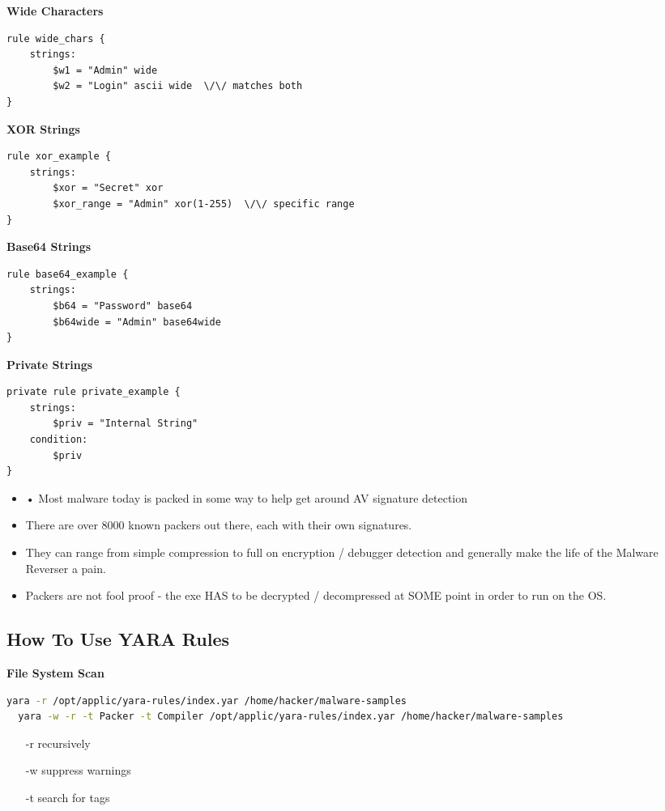 \textbf{Wide Characters}
\begin{lstlisting}[language=YARA]
rule wide_chars {
    strings:
        $w1 = "Admin" wide
        $w2 = "Login" ascii wide  \/\/ matches both
}
\end{lstlisting}

\textbf{XOR Strings}
\begin{lstlisting}[language=YARA]
rule xor_example {
    strings:
        $xor = "Secret" xor
        $xor_range = "Admin" xor(1-255)  \/\/ specific range
}
\end{lstlisting}

\textbf{Base64 Strings}
\begin{lstlisting}[language=YARA]
rule base64_example {
    strings:
        $b64 = "Password" base64
        $b64wide = "Admin" base64wide
}
\end{lstlisting}

\textbf{Private Strings}
\begin{lstlisting}[language=YARA]
private rule private_example {
    strings:
        $priv = "Internal String"
    condition:
        $priv
}
\end{lstlisting}

\begin{itemize}
  \item • Most malware today is packed in some way to help get around AV signature detection
  \item There are over 8000 known packers out there, each with their own signatures.
  \item They can range from simple compression to full on encryption / debugger detection and generally make the life of the Malware Reverser a pain.
  \item Packers are not fool proof - the exe HAS to be decrypted / decompressed at SOME point in order to run on the OS.
\end{itemize}

\subsection{How To Use YARA Rules}
\textbf{File System Scan}
\begin{lstlisting}[language=bash]
  yara -r /opt/applic/yara-rules/index.yar /home/hacker/malware-samples
  yara -w -r -t Packer -t Compiler /opt/applic/yara-rules/index.yar /home/hacker/malware-samples
\end{lstlisting}
\begin{itemize}
  \item[-r] recursively
  \item[-w] suppress warnings
  \item[-t] search for tags
\end{itemize}

